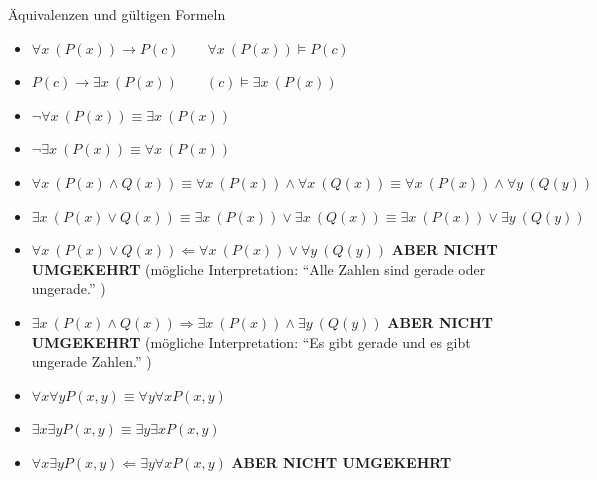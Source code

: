 \begin{bsp*}{Äquivalenzen und gültigen Formeln}
	\begin{itemize}
		\item $\forall x~( P( x ) ) \rightarrow P( c ) \qquad \forall x~( P( x ) ) \models P( c )$
		\item $P( c ) \rightarrow \exists x~( P( x ) ) \qquad ( c ) \models \exists x~( P( x ) )$
		\item $\neg \forall x~( P( x ) ) \equiv \exists x~( P( x ) )$
		\item $\neg \exists x~( P( x ) ) \equiv \forall x~( P( x ) )$
		\item $\forall x~( P( x ) \wedge Q( x ) ) \equiv \forall x~( P( x ) ) \wedge \forall x~( Q( x ) ) \equiv \forall x~( P( x ) ) \wedge \forall y~( Q( y ) )$
		\item $\exists x~( P( x ) \vee Q( x ) ) \equiv \exists x~( P( x ) ) \vee \exists x~( Q( x ) ) \equiv \exists x~( P( x ) ) \vee \exists y~( Q( y ) )$
		\item $\forall x~( P( x ) \vee Q( x ) ) \Leftarrow \forall x~( P( x ) ) \vee \forall y~( Q( y ) )$  \quad \textbf{ABER NICHT UMGEKEHRT} (mögliche Interpretation: \enquote{Alle Zahlen sind gerade oder ungerade.} )
		\item $\exists x~( P( x ) \wedge Q( x ) ) \Rightarrow \exists x~( P( x ) ) \wedge \exists y~( Q( y ) )$  \quad \textbf{ABER NICHT UMGEKEHRT} (mögliche Interpretation: \enquote{Es gibt gerade und es gibt ungerade Zahlen.} )
		\item $\forall x \forall y P( x , y ) \equiv \forall y \forall x P( x , y )$
		\item $\exists x \exists y P( x , y ) \equiv \exists y \exists x P( x , y )$
		\item $\forall x \exists y P( x , y ) \Leftarrow \exists y \forall x P( x , y )$ \quad \textbf{ABER NICHT UMGEKEHRT}
	\end{itemize}
\end{bsp*}

